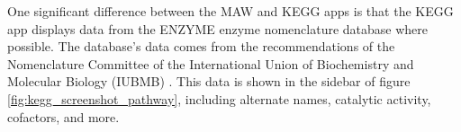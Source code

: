 One significant difference between the MAW and KEGG apps is that the KEGG app
displays data from the ENZYME enzyme nomenclature database where possible.  The
database's data comes from the recommendations of the Nomenclature Committee of
the International Union of Biochemistry and Molecular Biology (IUBMB)
\cite{enzyme-database}. This data is shown in the sidebar of figure
\ref{fig:kegg_screenshot_pathway}, including alternate names, catalytic
activity, cofactors, and more.
